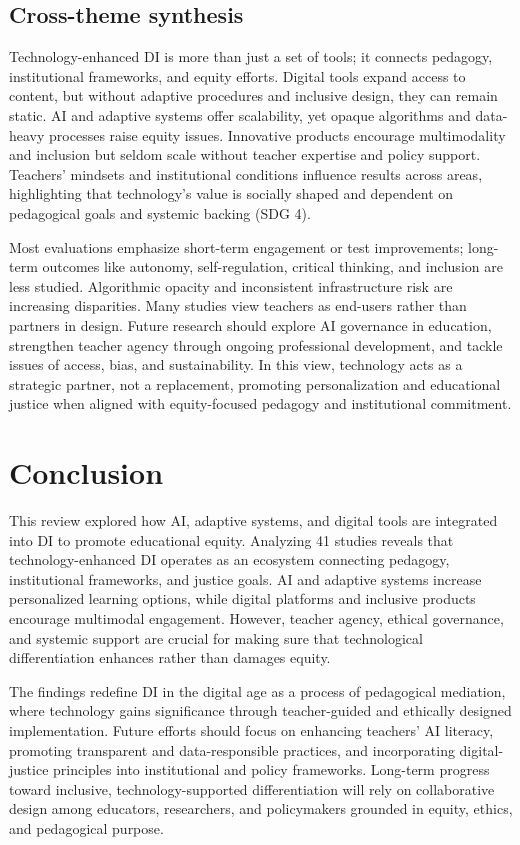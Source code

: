 \documentclass[english]{textolivre}
\begin{document}
\subsection{Cross-theme synthesis}
Technology-enhanced DI is more than just a set of tools; it connects pedagogy, institutional frameworks, and equity efforts. Digital tools expand access to content, but without adaptive procedures and inclusive design, they can remain static. AI and adaptive systems offer scalability, yet opaque algorithms and data-heavy processes raise equity issues. Innovative products encourage multimodality and inclusion but seldom scale without teacher expertise and policy support. Teachers’ mindsets and institutional conditions influence results across areas, highlighting that technology’s value is socially shaped and dependent on pedagogical goals and systemic backing (SDG 4).

Most evaluations emphasize short-term engagement or test improvements; long-term outcomes like autonomy, self-regulation, critical thinking, and inclusion are less studied. Algorithmic opacity and inconsistent infrastructure risk are increasing disparities. Many studies view teachers as end-users rather than partners in design. Future research should explore AI governance in education, strengthen teacher agency through ongoing professional development, and tackle issues of access, bias, and sustainability. In this view, technology acts as a strategic partner, not a replacement, promoting personalization and educational justice when aligned with equity-focused pedagogy and institutional commitment.

\section{Conclusion}
This review explored how AI, adaptive systems, and digital tools are integrated into DI to promote educational equity. Analyzing 41 studies reveals that technology-enhanced DI operates as an ecosystem connecting pedagogy, institutional frameworks, and justice goals. AI and adaptive systems increase personalized learning options, while digital platforms and inclusive products encourage multimodal engagement. However, teacher agency, ethical governance, and systemic support are crucial for making sure that technological differentiation enhances rather than damages equity.

The findings redefine DI in the digital age as a process of pedagogical mediation, where technology gains significance through teacher-guided and ethically designed implementation. Future efforts should focus on enhancing teachers’ AI literacy, promoting transparent and data-responsible practices, and incorporating digital-justice principles into institutional and policy frameworks. Long-term progress toward inclusive, technology-supported differentiation will rely on collaborative design among educators, researchers, and policymakers grounded in equity, ethics, and pedagogical purpose.
\end{document}
